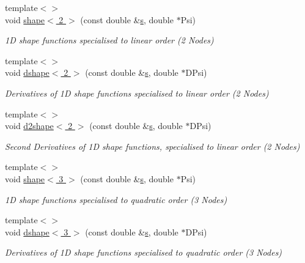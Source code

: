 \begin{DoxyCompactItemize}
{\footnotesize template$<$$>$ }\\void \hyperlink{namespaceoomph_1_1OneDimLagrange_aec7f5263cb672ddfef50bdd3462ada19}{shape$<$ 2 $>$} (const double \&\hyperlink{cfortran_8h_ab7123126e4885ef647dd9c6e3807a21c}{s}, double $\ast$Psi)
\begin{DoxyCompactList}\small\item\em 1D shape functions specialised to linear order (2 Nodes) \end{DoxyCompactList}\item 
{\footnotesize template$<$$>$ }\\void \hyperlink{namespaceoomph_1_1OneDimLagrange_a956411abc42594a039c368e4ef69f48e}{dshape$<$ 2 $>$} (const double \&\hyperlink{cfortran_8h_ab7123126e4885ef647dd9c6e3807a21c}{s}, double $\ast$D\+Psi)
\begin{DoxyCompactList}\small\item\em Derivatives of 1D shape functions specialised to linear order (2 Nodes) \end{DoxyCompactList}\item 
{\footnotesize template$<$$>$ }\\void \hyperlink{namespaceoomph_1_1OneDimLagrange_a2ee22e982dfd4a46e5b0b7fd9f627498}{d2shape$<$ 2 $>$} (const double \&\hyperlink{cfortran_8h_ab7123126e4885ef647dd9c6e3807a21c}{s}, double $\ast$D\+Psi)
\begin{DoxyCompactList}\small\item\em Second Derivatives of 1D shape functions, specialised to linear order (2 Nodes) \end{DoxyCompactList}\item 
{\footnotesize template$<$$>$ }\\void \hyperlink{namespaceoomph_1_1OneDimLagrange_acccbf08730b769433dd95c7c564fa28a}{shape$<$ 3 $>$} (const double \&\hyperlink{cfortran_8h_ab7123126e4885ef647dd9c6e3807a21c}{s}, double $\ast$Psi)
\begin{DoxyCompactList}\small\item\em 1D shape functions specialised to quadratic order (3 Nodes) \end{DoxyCompactList}\item 
{\footnotesize template$<$$>$ }\\void \hyperlink{namespaceoomph_1_1OneDimLagrange_a5c1810613afa59bde79eecb02996caa3}{dshape$<$ 3 $>$} (const double \&\hyperlink{cfortran_8h_ab7123126e4885ef647dd9c6e3807a21c}{s}, double $\ast$D\+Psi)
\begin{DoxyCompactList}\small\item\em Derivatives of 1D shape functions specialised to quadratic order (3 Nodes) \end{DoxyCompactList}\item 

\end{DoxyCompactItemize}
